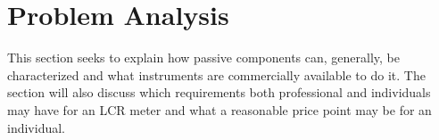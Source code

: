 \chapter{Problem Analysis} \label{ch:ProblemAnalysis}
This section seeks to explain how passive components can, generally, be characterized and what instruments are commercially available to do it. The section will also discuss which requirements both professional and individuals may have for an LCR meter and what a reasonable price point may be for an individual.